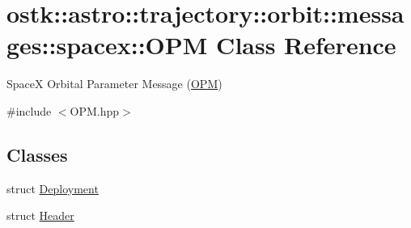 \hypertarget{classostk_1_1astro_1_1trajectory_1_1orbit_1_1messages_1_1spacex_1_1_o_p_m}{}\section{ostk\+:\+:astro\+:\+:trajectory\+:\+:orbit\+:\+:messages\+:\+:spacex\+:\+:O\+PM Class Reference}
\label{classostk_1_1astro_1_1trajectory_1_1orbit_1_1messages_1_1spacex_1_1_o_p_m}


SpaceX Orbital Parameter Message (\hyperlink{classostk_1_1astro_1_1trajectory_1_1orbit_1_1messages_1_1spacex_1_1_o_p_m}{O\+PM})  




{\ttfamily \#include $<$O\+P\+M.\+hpp$>$}

\subsection*{Classes}
\begin{DoxyCompactItemize}
\item 
struct \hyperlink{structostk_1_1astro_1_1trajectory_1_1orbit_1_1messages_1_1spacex_1_1_o_p_m_1_1_deployment}{Deployment}
\item 
struct \hyperlink{structostk_1_1astro_1_1trajectory_1_1orbit_1_1messages_1_1spacex_1_1_o_p_m_1_1_header}{Header}
\end{DoxyCompactItemize}
